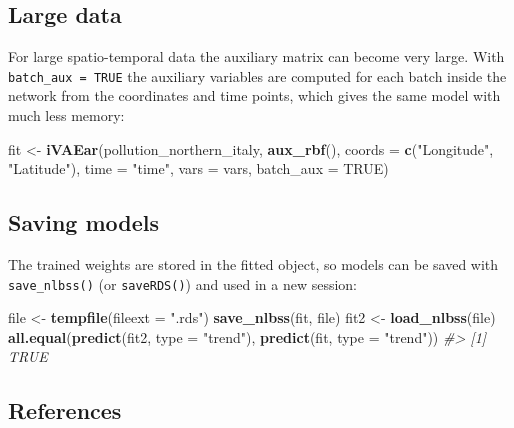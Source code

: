 \documentclass[
]{article}
\newenvironment{Shaded}{\begin{snugshade}}{\end{snugshade}}
\newcommand{\AttributeTok}[1]{\textcolor[rgb]{0.13,0.29,0.53}{#1}}
\newcommand{\CommentTok}[1]{\textcolor[rgb]{0.56,0.35,0.01}{\textit{#1}}}
\newcommand{\ConstantTok}[1]{\textcolor[rgb]{0.56,0.35,0.01}{#1}}
\newcommand{\FunctionTok}[1]{\textcolor[rgb]{0.13,0.29,0.53}{\textbf{#1}}}
\newcommand{\NormalTok}[1]{#1}
\newcommand{\OtherTok}[1]{\textcolor[rgb]{0.56,0.35,0.01}{#1}}
\newcommand{\StringTok}[1]{\textcolor[rgb]{0.31,0.60,0.02}{#1}}
\begin{document}
\subsection{Large data}\label{large-data}

For large spatio-temporal data the auxiliary matrix can become very
large. With \texttt{batch\_aux\ =\ TRUE} the auxiliary variables are
computed for each batch inside the network from the coordinates and time
points, which gives the same model with much less memory:

\begin{Shaded}
\begin{Highlighting}[]
\NormalTok{fit }\OtherTok{\textless{}{-}} \FunctionTok{iVAEar}\NormalTok{(pollution\_northern\_italy, }\FunctionTok{aux\_rbf}\NormalTok{(),}
              \AttributeTok{coords =} \FunctionTok{c}\NormalTok{(}\StringTok{"Longitude"}\NormalTok{, }\StringTok{"Latitude"}\NormalTok{), }\AttributeTok{time =} \StringTok{"time"}\NormalTok{, }\AttributeTok{vars =}\NormalTok{ vars,}
              \AttributeTok{batch\_aux =} \ConstantTok{TRUE}\NormalTok{)}
\end{Highlighting}
\end{Shaded}

\subsection{Saving models}\label{saving-models}

The trained weights are stored in the fitted object, so models can be
saved with \texttt{save\_nlbss()} (or \texttt{saveRDS()}) and used in a
new session:

\begin{Shaded}
\begin{Highlighting}[]
\NormalTok{file }\OtherTok{\textless{}{-}} \FunctionTok{tempfile}\NormalTok{(}\AttributeTok{fileext =} \StringTok{".rds"}\NormalTok{)}
\FunctionTok{save\_nlbss}\NormalTok{(fit, file)}
\NormalTok{fit2 }\OtherTok{\textless{}{-}} \FunctionTok{load\_nlbss}\NormalTok{(file)}
\FunctionTok{all.equal}\NormalTok{(}\FunctionTok{predict}\NormalTok{(fit2, }\AttributeTok{type =} \StringTok{"trend"}\NormalTok{), }\FunctionTok{predict}\NormalTok{(fit, }\AttributeTok{type =} \StringTok{"trend"}\NormalTok{))}
\CommentTok{\#\textgreater{} [1] TRUE}
\end{Highlighting}
\end{Shaded}

\subsection{References}\label{references}
\end{document}
